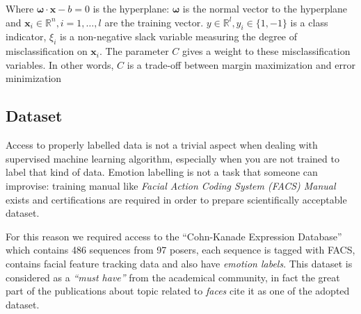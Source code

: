  Where $\boldsymbol{\omega} \cdot \textbf{x} - b = 0$ is the hyperplane:
 $\boldsymbol{\omega}$ is the normal vector to the hyperplane and $\textbf{x}_i
 \in \mathbb{R}^n, i = 1,\dots,l$ are the training vector.  $y \in \mathbb{R}^l,
 y_i \in \{1, -1\}$ is a class indicator, $\xi_i$ is a non-negative slack
 variable measuring the degree of misclassification on $\textbf{x}_i$. The
 parameter $C$ gives a weight to these misclassification variables. In other
 words, $C$ is a trade-off between margin maximization and error minimization

\subsection{Dataset}

Access to properly labelled data is not a trivial aspect when dealing with supervised machine learning algorithm, especially when you are not trained to label that kind of data. Emotion labelling is not a task that someone can improvise: training manual like \emph{Facial Action Coding System (FACS) Manual} exists and certifications are required in order to prepare scientifically acceptable dataset.

For this reason we required access to the ``Cohn-Kanade Expression Database''\cite{Kanade2000} which contains 486 sequences from 97 posers, each sequence is tagged with FACS, contains facial feature tracking data and also have \emph{emotion labels}. This dataset is considered as a \emph{``must have''} from the academical community, in fact the great part of the publications about topic related to \emph{faces} cite it as one of the adopted dataset.
